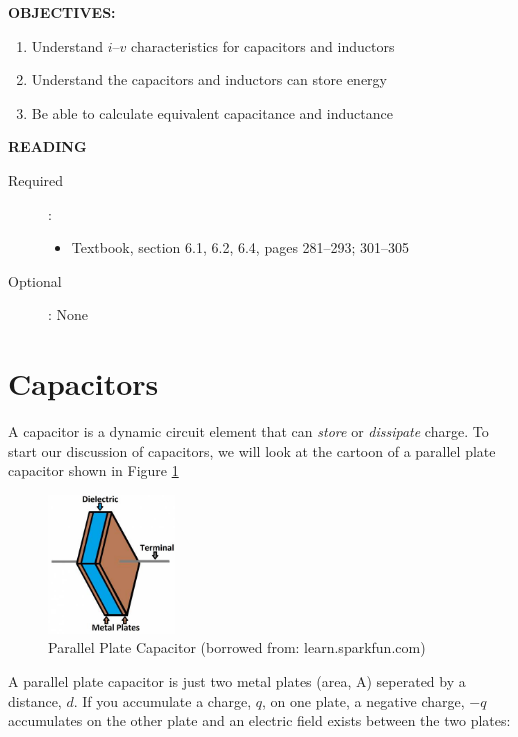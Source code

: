 \documentclass{handout}
\begin{document}
\maketitle

\textbf{OBJECTIVES:}
\begin{enumerate}
\item Understand $i$--$v$ characteristics for capacitors and inductors
\item Understand the capacitors and inductors can store energy
\item Be able to calculate equivalent capacitance and inductance
\end{enumerate}

\textbf{READING}
\begin{description}
\item [Required]:
\begin{itemize}
\item  Textbook, section 6.1, 6.2, 6.4, pages 281--293; 301--305
\end{itemize}
\item [Optional]: None
\end{description}

\section{Capacitors}
A capacitor is a dynamic circuit element that can {\em store} or {\em dissipate} charge.  To start our discussion of capacitors, we will look at the cartoon of a parallel plate capacitor shown in Figure \ref{fig: Capacitor}

\begin{figure} [h!]
\centering
\includegraphics[width=0.3\textwidth]{Capacitor.jpg}
\caption{Parallel Plate Capacitor (borrowed from: learn.sparkfun.com)}
\label{fig: Capacitor}
\end{figure}

A parallel plate capacitor is just two metal plates (area, A) seperated by a distance, $d$.  If you accumulate a charge, $q$, on one plate, a negative charge, $-q$ accumulates on the other plate and an electric field exists between the two plates:
\end{document}
